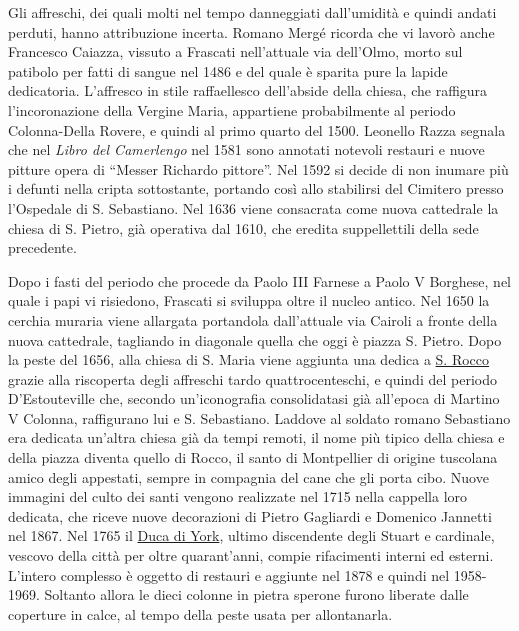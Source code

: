 \documentclass[
  letterpaper,
  DIV=11,
  numbers=noendperiod]{scrartcl}
\begin{document}
Gli affreschi, dei quali molti nel tempo danneggiati dall'umidità e
quindi andati perduti, hanno attribuzione incerta. Romano Mergé ricorda
che vi lavorò anche Francesco Caiazza, vissuto a Frascati nell'attuale
via dell'Olmo, morto sul patibolo per fatti di sangue nel 1486 e del
quale è sparita pure la lapide dedicatoria. L'affresco in stile
raffaellesco dell'abside della chiesa, che raffigura l'incoronazione
della Vergine Maria, appartiene probabilmente al periodo Colonna-Della
Rovere, e quindi al primo quarto del 1500. Leonello Razza segnala che
nel \emph{Libro del Camerlengo} nel 1581 sono annotati notevoli restauri
e nuove pitture opera di ``Messer Richardo pittore''. Nel 1592 si decide
di non inumare più i defunti nella cripta sottostante, portando così
allo stabilirsi del Cimitero presso l'Ospedale di S. Sebastiano. Nel
1636 viene consacrata come nuova cattedrale la chiesa di S. Pietro, già
operativa dal 1610, che eredita suppellettili della sede precedente.

Dopo i fasti del periodo che procede da Paolo III Farnese a Paolo V
Borghese, nel quale i papi vi risiedono, Frascati si sviluppa oltre il
nucleo antico. Nel 1650 la cerchia muraria viene allargata portandola
dall'attuale via Cairoli a fronte della nuova cattedrale, tagliando in
diagonale quella che oggi è piazza S. Pietro. Dopo la peste del 1656,
alla chiesa di S. Maria viene aggiunta una dedica a
\protect\hyperlink{0}{S. Rocco} grazie alla riscoperta degli affreschi
tardo quattrocenteschi, e quindi del periodo D'Estouteville che, secondo
un'iconografia consolidatasi già all'epoca di Martino V Colonna,
raffigurano lui e S. Sebastiano. Laddove al soldato romano Sebastiano
era dedicata un'altra chiesa già da tempi remoti, il nome più tipico
della chiesa e della piazza diventa quello di Rocco, il santo di
Montpellier di origine tuscolana amico degli appestati, sempre in
compagnia del cane che gli porta cibo. Nuove immagini del culto dei
santi vengono realizzate nel 1715 nella cappella loro dedicata, che
riceve nuove decorazioni di Pietro Gagliardi e Domenico Jannetti nel
1867. Nel 1765 il \protect\hyperlink{0}{Duca di York}, ultimo
discendente degli Stuart e cardinale, vescovo della città per oltre
quarant'anni, compie rifacimenti interni ed esterni. L'intero complesso
è oggetto di restauri e aggiunte nel 1878 e quindi nel 1958-1969.
Soltanto allora le dieci colonne in pietra sperone furono liberate dalle
coperture in calce, al tempo della peste usata per allontanarla.
\end{document}
